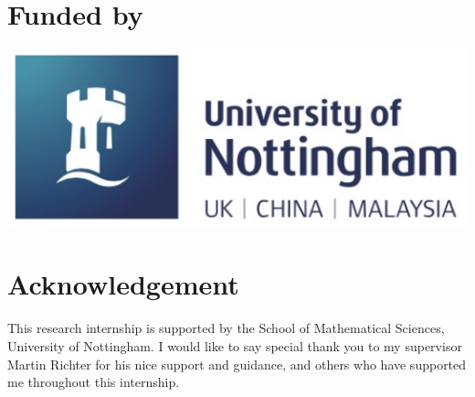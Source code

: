 \documentclass[a0,portrait]{a0poster}
\begin{document}
\begin{multicols}{3}

\small
\nocite{*} %

\section*{Funded by}
\begin{center}\vspace{0cm}
\includegraphics[width=0.95\linewidth]{logo.png}
\end{center}%

\section*{Acknowledgement}
This research internship is supported by the School of Mathematical Sciences, University of Nottingham. I would like to say special thank you to my supervisor Martin Richter for his nice support and guidance, and others who have supported me throughout this internship.



\end{multicols}
\end{document}
